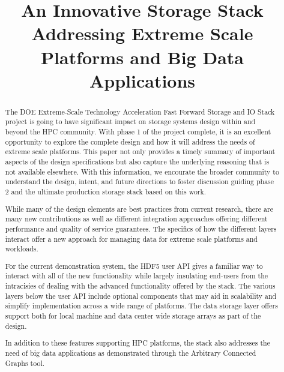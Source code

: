 \documentclass[conference]{IEEEtran}
\begin{document}

\title{An Innovative Storage Stack Addressing Extreme Scale Platforms and Big Data Applications}

\author{
}
\maketitle

\begin{abstract}
The DOE Extreme-Scale Technology Acceleration Fast Forward Storage and IO Stack
project is going to have significant impact on storage systems design within
and beyond the HPC community. With phase 1 of the project complete, it is an
excellent opportunity to explore the complete design and how it will address
the needs of extreme scale platforms.  This paper not only provides a timely
summary of important aspects of the design specifications but also capture the
underlying reasoning that is not available elsewhere. With this information, we
encourate the broader community to understand the design, intent, and future
directions to foster discussion guiding phase 2 and the ultimate production
storage stack based on this work.

While many of the design elements are best practices from current research,
there are many new contributions as well as different integration approaches
offering different performance and quality of service guarantees. The specifics
of how the different layers interact offer a new approach for managing data for
extreme scale platforms and workloads.

For the current demonstration system, the HDF5 user API gives a familiar
way to interact with all of the new functionality while largely insulating 
end-users from the intracisies of dealing with the advanced functionality
offered by the stack.  The various layers below the user API include optional
components that may aid in scalability and simplify implementation across a
wide range of platforms.  The data storage layer offers support both
for local machine and data center wide storage arrays as part of the design.

In addition to these features supporting HPC platforms, the stack also
addresses the need of big data applications as demonstrated through the
Arbitrary Connected Graphs tool.

\end{abstract}
\end{document}
